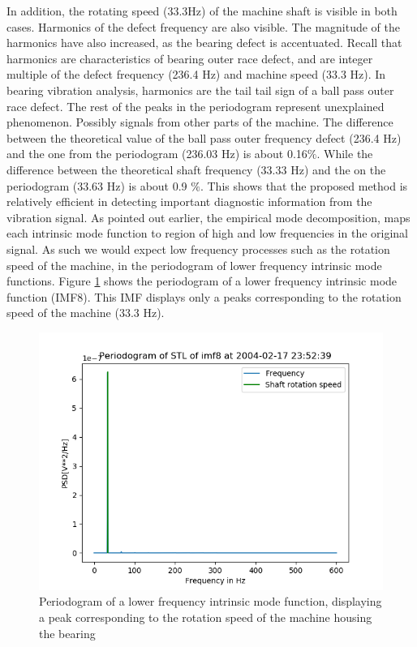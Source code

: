 \documentclass[../Main/thesis.tex]{subfiles}
\begin{document}
\justify
In addition, the rotating speed (33.3Hz) of the machine shaft is visible in both cases. Harmonics of the defect frequency are also visible. The magnitude of the harmonics have also increased, as the bearing defect is accentuated. Recall that harmonics are characteristics of bearing outer race defect, and are integer multiple of the defect frequency (236.4 Hz) and machine speed (33.3 Hz). In bearing vibration analysis, harmonics are the tail tail sign of a ball pass outer race defect. The rest of the peaks in the periodogram represent unexplained phenomenon. Possibly signals from other parts of the machine.
\justify
The difference between the theoretical value of the ball pass outer frequency defect (236.4 Hz) and the one from the periodogram (236.03 Hz) is about 0.16$\%$. While the difference between the theoretical shaft frequency (33.33 Hz) and the on the periodogram (33.63 Hz) is about 0.9 $\%$. This shows that the proposed method is relatively efficient in detecting important diagnostic information from the vibration signal. 
\justify
As pointed out earlier, the empirical mode decomposition, maps each intrinsic mode function to region of high and low frequencies in the original signal. As such we would expect low frequency processes such as the rotation speed of the machine, in the periodogram of lower frequency intrinsic mode functions. Figure \ref{fig:endimf8shaft} shows the periodogram of a lower frequency intrinsic mode function (IMF8). This IMF displays only a peaks corresponding to the rotation speed of the machine (33.3 Hz).
\begin{figure}[H]
	\centering
	\includegraphics[width=0.9\linewidth]{../fig/periodogram_bpfo/end_imf8_shaft}
	\caption{Periodogram of a lower frequency intrinsic mode function, displaying a peak corresponding to the rotation speed of the machine housing the bearing}
	\label{fig:endimf8shaft}
\end{figure}
\end{document}
